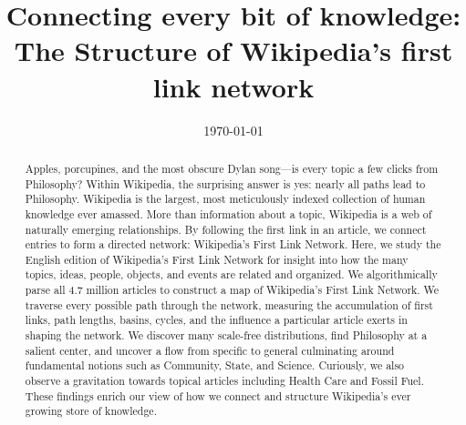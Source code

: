 \documentclass[pre,twocolumn,twoside,superscriptaddress,floatfix, aps, 10pt]{revtex4-1}
\begin{document}
\title{\protect
Connecting every bit of knowledge: \\
The Structure of Wikipedia's first link network
}

\date{\today}

\author{
}


\author{
}


\author{
}




\begin{abstract}
  \protect
Apples, porcupines, and the most obscure Dylan song---is every topic a few clicks from Philosophy? 
Within Wikipedia, the surprising answer is yes: nearly all 
paths lead to Philosophy.
Wikipedia is the largest, most meticulously indexed collection of human knowledge ever amassed. 
More than information about a topic, Wikipedia is a web of naturally emerging relationships.  
By following the first link in an article, we connect entries to form a directed network: Wikipedia's First Link Network. 
Here, we study the English edition of Wikipedia's First Link Network for insight into how the many topics, ideas, people, objects, and events
are related and organized.  
We algorithmically parse all 4.7 million articles to construct a map of Wikipedia's First Link Network. 
We traverse every possible path through the network, 
measuring the accumulation of first links, path lengths, basins, cycles, and the influence a particular article exerts in shaping the 
network.
We discover many scale-free distributions, find Philosophy at a salient center, and uncover a flow from specific to general 
culminating around fundamental notions such as Community, State, and Science. 
Curiously, we also observe a gravitation towards topical articles including Health Care and Fossil Fuel.
These findings enrich our view of how we connect and structure
Wikipedia's ever growing store of knowledge.
 
\end{abstract}
\end{document}
